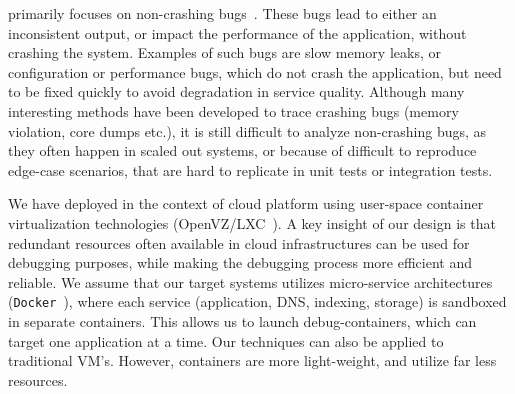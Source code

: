 \parikshan primarily focuses on non-crashing bugs~\cite{Zhang:2013:ADS:2486788.2486830, liu2005mining, kremenek2007factor}.
These bugs lead to either an inconsistent output, or impact the performance of the application, without crashing the system.
Examples of such bugs are slow memory leaks, or configuration or performance bugs, which do not crash the application, but need to be fixed quickly to avoid degradation in service quality. 
Although many interesting methods have been developed to trace crashing bugs (memory violation, core dumps etc.), it is still difficult to analyze non-crashing bugs, as they often happen in scaled out systems, or because of difficult to reproduce edge-case scenarios, that are hard to replicate in unit tests or integration tests. 

We have deployed \parikshan in the context of cloud platform using user-space container virtualization technologies (OpenVZ/LXC~\cite{openvz,lxc}).
A key insight of our design is that redundant resources often available in cloud infrastructures can be used for debugging purposes, while making the debugging process more efficient and reliable.
We assume that our target systems utilizes micro-service architectures (\texttt{Docker}~\cite{docker}), where each service (application, DNS, indexing, storage) is sandboxed in separate containers.
This allows us to launch debug-containers, which can target one application at a time.
Our techniques can also be applied to traditional VM's. 
However, containers are more light-weight, and utilize far less resources.


